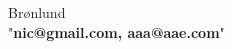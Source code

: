 \documentclass{article}
\begin{document}
Brønlund \\
"\textbf{nic@gmail.com, aaa@aae.com}"
\end{document}

